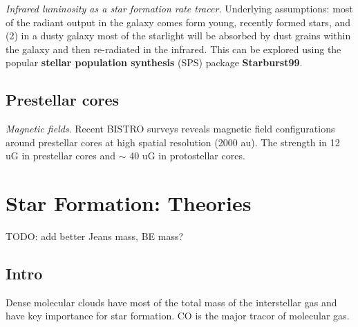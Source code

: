 \emph{Infrared luminosity as a star formation rate tracer.} Underlying assumptions: most of the radiant output in the galaxy comes form young, recently formed stars, and (2) in a dusty galaxy most of the starlight will be absorbed by dust grains within the galaxy and then re-radiated in the infrared. This can be explored using the popular \textbf{stellar population synthesis} (SPS) package \textbf{Starburst99}.


\subsection{Prestellar cores}

\emph{Magnetic fields}. Recent BISTRO surveys \citep{Eswaraiah2021} reveals magnetic field configurations around prestellar cores at high spatial resolution (2000 au). The strength in 12 uG in prestellar cores and $\sim$ 40 uG in protostellar cores. 

\section{Star Formation: Theories}
\label{sec:SF:T}

TODO: add better Jeans mass, BE mass?

\subsection{Intro}
\label{sec:orge6e6244}
Dense molecular clouds have most of the total mass of the interstellar
gas and have key importance for star formation. CO is the major tracor
of molecular gas.

